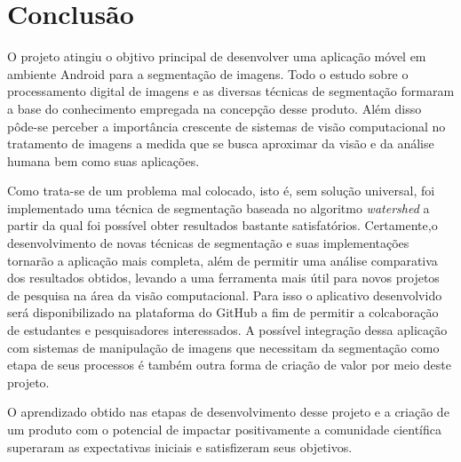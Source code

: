 \chapter{Conclusão}\label{cap:conclusao}

O projeto atingiu o objtivo principal de desenvolver uma aplicação móvel em ambiente Android para a segmentação de imagens. Todo o estudo sobre o processamento digital de imagens e as diversas técnicas de segmentação formaram a base do conhecimento empregada na concepção desse produto. Além disso pôde-se perceber a importância crescente de sistemas de visão computacional no tratamento de imagens a medida que se busca aproximar da visão e da análise humana bem como suas aplicações.

Como trata-se de um problema mal colocado, isto é, sem solução universal, foi implementado uma técnica de segmentação baseada no algoritmo \textit{watershed} a partir da qual foi possível obter resultados bastante satisfatórios. Certamente,o desenvolvimento de novas técnicas de segmentação e suas implementações tornarão a aplicação mais completa, além de permitir uma análise comparativa dos resultados obtidos, levando a uma ferramenta mais útil para novos projetos de pesquisa na área da visão computacional. Para isso o aplicativo desenvolvido será disponibilizado na plataforma do GitHub a fim de permitir a colcaboração de estudantes e pesquisadores interessados. A possível integração dessa aplicação com sistemas de manipulação de imagens que necessitam da segmentação como etapa de seus processos é também outra forma de criação de valor por meio deste projeto.

O aprendizado obtido nas etapas de desenvolvimento desse projeto e a criação de um produto com o potencial de impactar positivamente a comunidade científica superaram as expectativas iniciais e satisfizeram seus objetivos.



